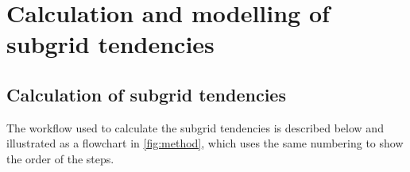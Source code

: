 \documentclass[../main.tex]{subfiles}
\begin{document}
\ifSubfilesClassLoaded{
    \frontmatter
    \tableofcontents
    \mainmatter
}{}

\chapter{Calculation and modelling of subgrid tendencies}
\label{chap:tendencies}
\setlength{\epigraphwidth}{.45\textwidth}



\section{Calculation of subgrid tendencies} \label{sec:calculation}
The workflow used to calculate the subgrid tendencies is described below and
illustrated as a flowchart in \cref{fig:method}, which uses the same numbering
to show the order of the steps.
\end{document}
